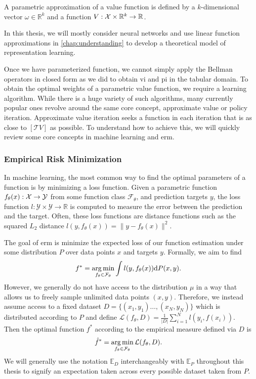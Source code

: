 \begin{definition}
    A parametric approximation of a value function is defined by a $k$-dimensional vector $\omega \in \mathbb{R}^k$ and a function $V: \mathcal{X} \times \mathbb{R}^k \rightarrow \mathbb{R}$.
\end{definition}

In this thesis, we will mostly consider neural networks and use linear function approximations in \autoref{chap:understanding} to develop a theoretical model of representation learning.

Once we have parameterized function, we cannot simply apply the Bellman operators in closed form as we did to obtain \ac{vi} and \ac{pi} in the tabular domain.
To obtain the optimal weights of a parametric value function, we require a learning algorithm.
While there is a huge variety of such algorithms, many currently popular ones revolve around the same core concept, approximate value or policy iteration.
Approximate value iteration seeks a function in each iteration that is as close to $[\mathcal{T}V]$ as possible.
To understand how to achieve this, we will quickly review some core concepts in machine learning and \ac{erm}.

\subsubsection{Empirical Risk Minimization}

In machine learning, the most common way to find the optimal parameters of a function is by minimizing a loss function.
Given a parametric function $f_\theta(x): \mathcal{X} \rightarrow \mathcal{Y}$ from some function class $\mathcal{F}_\theta$, and prediction targets $y$, the loss function $l: \mathcal{Y} \times \mathcal{Y} \rightarrow \mathbb{R}$ is computed to measure the error between the prediction and the target.
Often, these loss functions are distance functions such as the squared $L_2$ distance $l(y, f_\theta(x)) = \|y - f_\theta(x)\|^2.$

The goal of \ac{erm} is minimize the expected loss of our function estimation under some distribution $P$ over data points $x$ and targets $y$.
Formally, we aim to find $$f^* = \operatorname*{arg\,min}_{f_\theta\in\mathcal{F}_\theta} \int l(y, f_\theta(x)) \mathrm{d} P(x,y).$$
However, we generally do not have access to the distribution $\mu$ in a way that allows us to freely sample unlimited data points $(x,y)$.
Therefore, we instead assume access to a fixed dataset $D = \{(x_1, y_1) \dots, (x_N, y_N)\}$ which is distributed according to $P$ and define $\mathcal{L}(f_\theta,D) = \frac{1}{|D|} \sum_{i=1}^N l(y_i, f(x_i))$.
Then the optimal function $f^*$ according to the empirical measure defined via $D$ is $$\hat{f}^* = \operatorname*{arg\,min}_{f_\theta \in \mathcal{F}_\theta} \mathcal{L}(f_\theta,D).$$
We will generally use the notation $\mathbb{E}_D$ interchangeably with $\mathbb{E}_P$ throughout this thesis to signify an expectation taken across every possible dataset taken from $P$.

